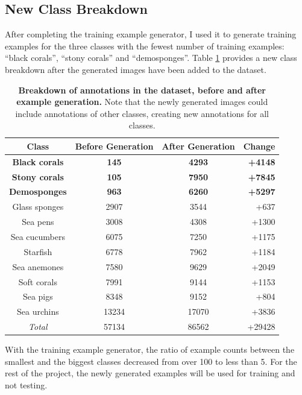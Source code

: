 \documentclass[12pt,a4paper,twoside,openany]{report}
\begin{document}
\subsection{New Class Breakdown} \label{section:new_class}
After completing the training example generator, I used it to generate training examples for the three classes with the fewest number of training examples: ``black corals'', ``stony corals'' and ``demosponges''. Table \ref{table:new_classes} provides a new class breakdown after the generated images have been added to the dataset.
\begin{table}[H]
    \centering
    \begin{tabular}{| c c c r |}
        \hline
         \textbf{Class} & \textbf{Before Generation}  & \textbf{After Generation} & \textbf{Change} \\
         \hline
         \hline 
        \textbf{Black corals}	& \textbf{145}	    & \textbf{4293}	& \textbf{+4148}\\
        \textbf{Stony corals}	& \textbf{105}	    & \textbf{7950}	& \textbf{+7845}\\
        \textbf{Demosponges}	    & \textbf{963}	    & \textbf{6260}	& \textbf{+5297}\\
        Glass sponges	& 2907	& 3544	& +637\\
        Sea pens	    & 3008	& 4308	& +1300\\
        Sea cucumbers	& 6075	& 7250	& +1175\\
        Starfish	    & 6778	& 7962	& +1184\\
        Sea anemones 	& 7580	& 9629	& +2049\\
        Soft corals	    & 7991	& 9144	& +1153\\
        Sea pigs	    & 8348	& 9152	& +804\\
        Sea urchins	    & 13234	& 17070	& +3836\\
        \hline
         \hline
         \textit{Total} & 57134 &  86562 & +29428\\
         \hline
    \end{tabular}
    \caption{\textbf{Breakdown of annotations in the dataset, before and after example generation.} Note that the newly generated images could include annotations of other classes, creating new annotations for all classes.}    
    \label{table:new_classes}
\end{table}

With the training example generator, the ratio of example counts between the smallest and the biggest classes decreased from over 100 to less than 5. For the rest of the project, the newly generated examples will be used for training and not testing.
\end{document}
